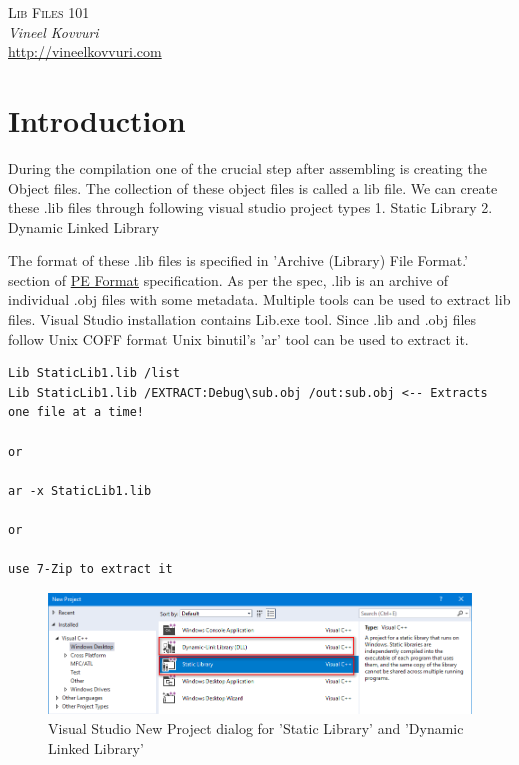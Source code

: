 \documentclass{article}
\begin{document}
\begin{titlepage}
   \begin{center}
      \Large\textsc{Lib Files 101}\\
      \vspace{5mm}
      \Large\textit{Vineel Kovvuri}\\
      \url{http://vineelkovvuri.com}\\
   \end{center}
\end{titlepage}

\tableofcontents

\newpage
\section{Introduction}
During the compilation one of the crucial step after assembling is
creating the Object files. The collection of these object files is
called a lib file. We can create these .lib files through following
visual studio project types
1. Static Library
2. Dynamic Linked Library

The format of these .lib files is specified in 'Archive (Library) File Format.'
section of \href{https://docs.microsoft.com/en-us/windows/desktop/debug/pe-format#archive-library-file-format}{PE Format}
specification. As per the spec, .lib is an archive of individual .obj
files with some metadata. Multiple tools can be used to
extract lib files. Visual Studio installation contains Lib.exe tool.
Since .lib and .obj files follow Unix COFF format Unix binutil's
'ar' tool can be used to extract it.

\begin{verbatim}
Lib StaticLib1.lib /list
Lib StaticLib1.lib /EXTRACT:Debug\sub.obj /out:sub.obj <-- Extracts one file at a time!

or

ar -x StaticLib1.lib

or

use 7-Zip to extract it
\end{verbatim}

\begin{figure}[H]
\centering
\includegraphics[width=\textwidth]{6.VSProjectDialog.png}
\caption{Visual Studio New Project dialog for 'Static Library' and 'Dynamic Linked Library' }
\end{figure}
\end{document}
